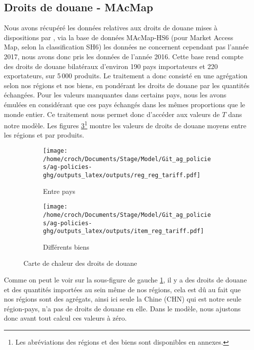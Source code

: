 \subsection{Droits de douane - MAcMap}

Nous avons récupéré les données relatives aux droits de douane mises à dispositions par \cite{Guimbard2012}, via la base de données MAcMap-HS6 (pour Market Access Map, selon la classification SH6) les données ne concernent cependant pas l'année 2017, nous avons donc pris les données de l'année 2016. Cette base rend compte des droits de douane bilatéraux d'environ 190 pays importateurs et 220 exportateurs, sur 5\,000 produits. Le traitement a donc consisté en une agrégation selon nos régions et nos biens, en pondérant les droits de douane par les quantités échangées. Pour les valeurs manquantes dans certains pays, nous les avons émulées en considérant que ces pays échangés dans les mêmes proportions que le monde entier. Ce traitement nous permet donc d'accéder aux valeurs de $T$ dans notre modèle. Les figures \ref{fig:macmap}\footnote{Les abréviations des régions et des biens sont disponibles en annexes.} montre les valeurs de droits de douane moyens entre les régions et par produits.

\begin{figure}[h!]
    \centering
    \begin{subfigure}[b]{0.495\textwidth}
        \centering
        \texttt{[image: /home/croch/Documents/Stage/Model/Git\_ag\_policies/ag-policies-ghg/outputs\_latex/outputs/reg\_reg\_tariff.pdf]}
        \caption{Entre pays}
        \label{fig:reg_reg}
    \end{subfigure}
    \begin{subfigure}[b]{0.495\textwidth}
        \centering
        \texttt{[image: /home/croch/Documents/Stage/Model/Git\_ag\_policies/ag-policies-ghg/outputs\_latex/outputs/item\_reg\_tariff.pdf]}
        \caption{Différents biens}
        \label{fig:item_reg}
    \end{subfigure}
    \caption{Carte de chaleur des droits de douane}
    \label{fig:macmap}
\end{figure}

Comme on peut le voir sur la sous-figure de gauche \ref{fig:reg_reg}, il y a des droits de douane et des quantités importées au sein même de nos régions, cela est dû au fait que nos régions sont des agrégats, ainsi ici seule la Chine (CHN) qui est notre seule région-pays, n'a pas de droits de douane en elle. Dans le modèle, nous ajustons donc avant tout calcul ces valeurs à zéro.



